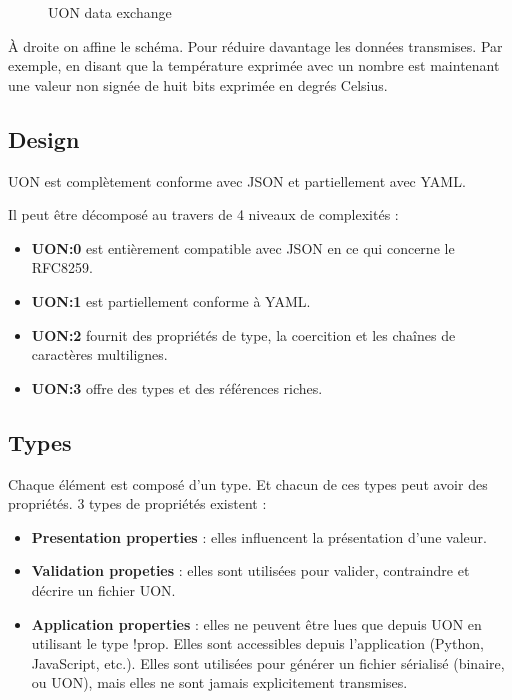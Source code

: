 \documentclass[
    iict, %
    il, %
]{heig-tb}
\begin{document}
\begin{figure}[H]
    \begin{center}
    \end{center}
    \caption[UON data exchange]{\label{data-exchange}UON data exchange}
\end{figure}

À droite on affine le schéma. Pour réduire davantage les données transmises.
Par exemple, en disant que la température exprimée avec un nombre est maintenant une valeur non signée de huit bits exprimée en degrés Celsius.

\subsection{Design}
UON est complètement conforme avec JSON et partiellement avec YAML.

Il peut être décomposé au travers de 4 niveaux de complexités :
\begin{itemize}
    \item \textbf{UON:0} est entièrement compatible avec JSON en ce qui concerne le RFC8259.
    \item \textbf{UON:1} est partiellement conforme à YAML.
    \item \textbf{UON:2} fournit des propriétés de type, la coercition et les chaînes de caractères multilignes.
    \item \textbf{UON:3} offre des types et des références riches.
\end{itemize}

\subsection{Types}
Chaque élément est composé d'un type. Et chacun de ces types peut avoir des propriétés.
3 types de propriétés existent :
\begin{itemize}
    \item \textbf{Presentation properties} : elles influencent la présentation d'une valeur.
    \item \textbf{Validation propeties} : elles sont utilisées pour valider, contraindre et décrire un fichier UON.
    \item \textbf{Application properties} : elles ne peuvent être lues que depuis UON en utilisant le type !prop. Elles sont accessibles depuis l'application (Python, JavaScript, etc.). Elles sont utilisées pour générer un fichier sérialisé (binaire, ou UON), mais elles ne sont jamais explicitement transmises.
\end{itemize}
\end{document}
